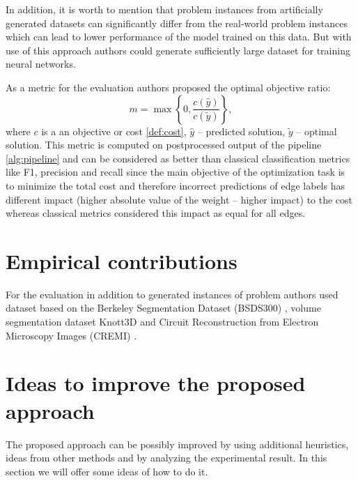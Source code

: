 \documentclass[10pt, twocolumn, a4paper]{article}
\theoremstyle{definition}
\begin{document}
In addition, it is worth to mention that problem instances from artificially generated datasets can
significantly differ from the real-world problem instances which can lead to lower performance of the model
trained on this data. But with use of this approach authors could generate sufficiently large
dataset for training neural networks.

As a metric for the evaluation authors proposed the optimal objective ratio:
\[
    m = \max \left\{ 0, \frac{c(\hat{y})}{c(\tilde{y})} \right\},
\]
where $c$ is a an objective or cost \eqref{def:cost}, $\hat{y}$ -- predicted solution,
$\tilde{y}$ -- optimal solution. This metric is computed on postprocessed output of the
pipeline \ref{alg:pipeline} and can be considered as better than classical classification
metrics like F1, precision and recall since the main objective of the optimization task is to
minimize the total cost and therefore incorrect predictions of edge labels has different impact (higher absolute value
of the weight -- higher impact) to the cost whereas classical metrics considered this impact as
equal for all edges.

\section{Empirical contributions} \label{sec:empirical_contib}

For the evaluation in addition to generated instances of problem authors used
dataset \citet{andres2011probabilistic} based on the Berkeley Segmentation Dataset (BSDS300) \citet{martin2001database},
volume segmentation dataset Knott3D \citet{andres2012globally} and
Circuit Reconstruction from Electron Microscopy Images (CREMI) \citet{beier2017multicut}.

\section{Ideas to improve the proposed approach}
The proposed approach can be possibly improved by using additional heuristics,
ideas from other methods and by analyzing the experimental result. In this section
we will offer some ideas of how to do it.
\end{document}
